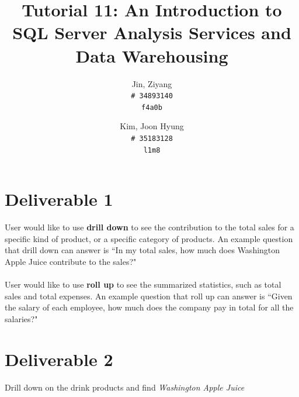 \documentclass{article}
\title{Tutorial 11: An Introduction to SQL Server Analysis Services and Data Warehousing}
\author{
	Jin, Ziyang\\
	\texttt{\# 34893140}\\
	\texttt{f4a0b}
	\and
	Kim, Joon Hyung\\
	\texttt{\# 35183128}\\
	\texttt{l1m8}
}
\begin{document}
	\maketitle

\section{Deliverable 1}

User would like to use \textbf{drill down} to see the contribution to the total sales for a specific kind of product, or a specific category of products. An example question that drill down can answer is ``In my total sales, how much does Washington Apple Juice contribute to the sales?"\\
\\
User would like to use \textbf{roll up} to see the summarized statistics, such as total sales and total expenses. An example question that roll up can answer is ``Given the salary of each employee, how much does the company pay in total for all the salaries?"

\section{Deliverable 2}

Drill down on the drink products and find \textit{Washington Apple Juice}
\end{document}
